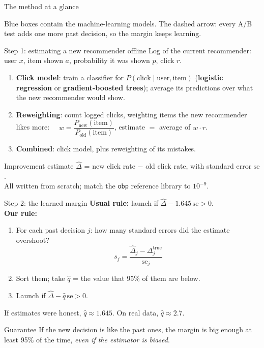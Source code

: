 \documentclass[aspectratio=169,11pt]{beamer}
\newcommand{\Dhat}{\widehat{\Delta}}
\newcommand{\se}{\mathrm{se}}
\begin{document}
\begin{frame}{The method at a glance}
\centering
\resizebox{!}{0.68\textheight}{}
\vspace{0.5em}

\raggedright
Blue boxes contain the machine-learning models. The dashed arrow: every A/B test adds one more past decision, so the margin keeps learning.
\end{frame}

\begin{frame}{Step 1: estimating a new recommender offline}
Log of the current recommender: user $x$, item shown $a$, probability it was shown $p$, click $r$.
\vspace{0.3em}
\begin{enumerate}
  \item \textbf{Click model}: train a classifier for $P(\text{click}\mid \text{user},\text{item})$ (\textbf{logistic regression} or \textbf{gradient-boosted trees}); average its predictions over what the new recommender would show.
  \item \textbf{Reweighting}: count logged clicks, weighting items the new recommender likes more:
  $\quad w = \dfrac{P_{\text{new}}(\text{item})}{P_{\text{old}}(\text{item})}$, \quad estimate $=$ average of $w \cdot r$.
  \item \textbf{Combined}: click model, plus reweighting of its mistakes.
\end{enumerate}
\vspace{0.3em}
Improvement estimate $\Dhat$ = new click rate $-$ old click rate, with standard error $\se$.\\
All written from scratch; match the \texttt{obp} reference library to $10^{-9}$.
\end{frame}

\begin{frame}{Step 2: the learned margin}
\textbf{Usual rule:} launch if $\Dhat - 1.645\,\se > 0$.\\[0.6em]
\textbf{Our rule:}
\begin{enumerate}
  \item For each past decision $j$: how many standard errors did the estimate overshoot?
  \[ s_j = \frac{\Dhat_j - \Delta_j^{\text{true}}}{\se_j} \]
  \item Sort them; take $\hat q$ = the value that 95\% of them are below.
  \item Launch if $\Dhat - \hat q\,\se > 0$.
\end{enumerate}
If estimates were honest, $\hat q \approx 1.645$. On real data, $\hat q \approx 2.7$.
\begin{block}{Guarantee}
If the new decision is like the past ones, the margin is big enough at least 95\% of the time, \emph{even if the estimator is biased}.
\end{block}
\end{frame}
\end{document}
